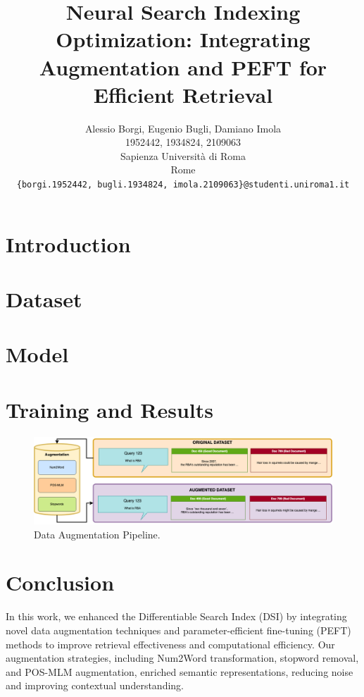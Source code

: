 \documentclass{article}
\title{Neural Search Indexing Optimization: Integrating Augmentation and PEFT for Efficient Retrieval}
\author{
  Alessio Borgi, Eugenio Bugli, Damiano Imola \\
  1952442, 1934824, 2109063 \\
  Sapienza Università di Roma \\
  Rome\\
  \texttt{\{borgi.1952442, bugli.1934824, imola.2109063\}@studenti.uniroma1.it} \\
}
\begin{document}
\maketitle

\begin{abstract}

\end{abstract}



\section{Introduction} 
\section{Dataset} 

\section{Model} 
\section{Training and Results} 

\begin{figure}
  \centering
  \includegraphics[width=\textwidth]{figs/dataset.png}
  \caption{Data Augmentation Pipeline.}
  \label{fig:fig1}
\end{figure}


\section{Conclusion}
In this work, we enhanced the Differentiable Search Index (DSI) by integrating novel data augmentation techniques and parameter-efficient fine-tuning (PEFT) methods to improve retrieval effectiveness and computational efficiency. Our augmentation strategies, including Num2Word transformation, stopword removal, and POS-MLM augmentation, enriched semantic representations, reducing noise and improving contextual understanding. 
\end{document}
